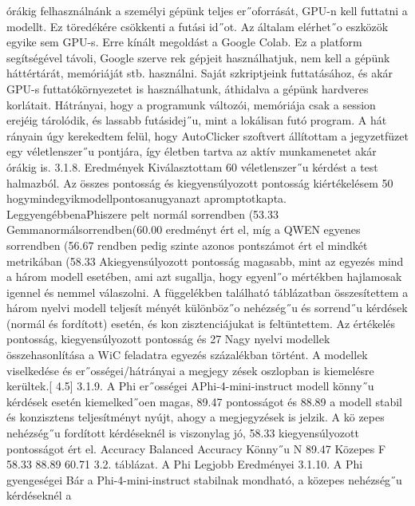 \documentclass[12pt]{report}
\theoremstyle{definition}
\begin{document}
 órákig felhasználnánk a személyi gépünk teljes er˝oforrását, GPU-n kell futtatni a modellt.
 Ez töredékére csökkenti a futási id˝ot. Az általam elérhet˝o eszközök egyike sem GPU-s.
 Erre kínált megoldást a Google Colab. Ez a platform segítségével távoli, Google szerve
rek gépjeit használhatjuk, nem kell a gépünk háttértárát, memóriáját stb. használni. Saját
 szkriptjeink futtatásához, és akár GPU-s futtatókörnyezetet is használhatunk, áthidalva
 a gépünk hardveres korlátait. Hátrányai, hogy a programunk változói, memóriája csak
 a session erejéig tárolódik, és lassabb futásidej˝u, mint a lokálisan futó program. A hát
rányain úgy kerekedtem felül, hogy AutoClicker szoftvert állítottam a jegyzetfüzet egy
 véletlenszer˝u pontjára, így életben tartva az aktív munkamenetet akár órákig is.
 3.1.8. Eredmények
 Kiválasztottam 60 véletlenszer˝u kérdést a test halmazból. Az összes pontosság
 és kiegyensúlyozott pontosság kiértékelésem 50%
 hogymindegyikmodellpontosanugyanazt apromptotkapta. LeggyengébbenaPhiszere
pelt normál sorrendben (53.33%
 Gemmanormálsorrendben(60.00%
 eredményt ért el, míg a QWEN egyenes sorrendben (56.67%
rendben pedig szinte azonos pontszámot ért el mindkét metrikában (58.33%
 Akiegyensúlyozott pontosság magasabb, mint az egyezés mind a három modell esetében,
 ami azt sugallja, hogy egyenl˝o mértékben hajlamosak igennel és nemmel válaszolni.
 A függelékben található táblázatban összesítettem a három nyelvi modell teljesít
ményét különböz˝o nehézség˝u és sorrend˝u kérdések (normál és fordított) esetén, és kon
zisztenciájukat is feltüntettem. Az értékelés pontosság, kiegyensúlyozott pontosság és
 27
Nagy nyelvi modellek összehasonlítása a WiC feladatra
 egyezés százalékban történt. A modellek viselkedése és er˝osségei/hátrányai a megjegy
zések oszlopban is kiemelésre kerültek.[ 4.5]
 3.1.9. A Phi er˝osségei
 APhi-4-mini-instruct modell könny˝u kérdések esetén kiemelked˝oen magas, 89.47%
 pontosságot és 88.89%
 a modell stabil és konzisztens teljesítményt nyújt, ahogy a megjegyzések is jelzik. A kö
zepes nehézség˝u fordított kérdéseknél is viszonylag jó, 58.33%
 kiegyensúlyozott pontosságot ért el.
 Accuracy Balanced Accuracy
 Könny˝u N 89.47%
 Közepes F 58.33%
 88.89%
 60.71%
 3.2. táblázat. A Phi Legjobb Eredményei
 3.1.10. A Phi gyengeségei
 Bár a Phi-4-mini-instruct stabilnak mondható, a közepes nehézség˝u kérdéseknél a
\end{document}
